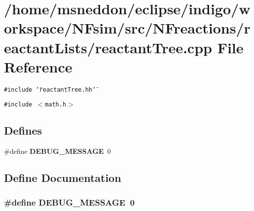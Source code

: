 \section{/home/msneddon/eclipse/indigo/workspace/NFsim/src/NFreactions/reactantLists/reactantTree.cpp File Reference}
\label{reactantTree_8cpp}


{\tt \#include \char`\"{}reactantTree.hh\char`\"{}}\par
{\tt \#include $<$math.h$>$}\par
\subsection*{Defines}
\begin{CompactItemize}
\item 
\#define {\bf DEBUG\_\-MESSAGE}~0
\end{CompactItemize}


\subsection{Define Documentation}
\subsubsection{\setlength{\rightskip}{0pt plus 5cm}\#define DEBUG\_\-MESSAGE~0}\label{reactantTree_8cpp_e8523807c48236b849d94507b9eae38f}


